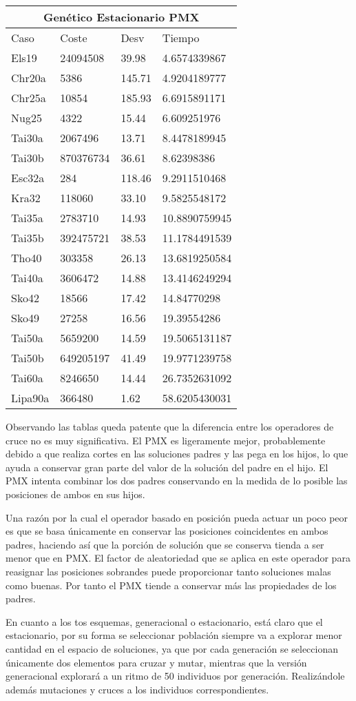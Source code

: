 \documentclass[twoside]{article}
\begin{document}
\begin{table}[h]
\centering
    \begin{tabular}{llll}
    \hline
    \multicolumn{4}{c}{Genético Estacionario PMX} \\
    \toprule
    Caso               & Coste & Desv & Tiempo \\
    \midrule
    Els19&24094508&39.98&4.6574339867\\
    Chr20a&5386&145.71&4.9204189777\\
    Chr25a&10854&185.93&6.6915891171\\
    Nug25&4322&15.44&6.609251976\\
    Tai30a&2067496&13.71&8.4478189945\\
    Tai30b&870376734&36.61&8.62398386\\
    Esc32a&284&118.46&9.2911510468\\
    Kra32&118060&33.10&9.5825548172\\
    Tai35a&2783710&14.93&10.8890759945\\
    Tai35b&392475721&38.53&11.1784491539\\
    Tho40&303358&26.13&13.6819250584\\
    Tai40a&3606472&14.88&13.4146249294\\
    Sko42&18566&17.42&14.84770298\\
    Sko49&27258&16.56&19.39554286\\
    Tai50a&5659200&14.59&19.5065131187\\
    Tai50b&649205197&41.49&19.9771239758\\
    Tai60a&8246650&14.44&26.7352631092\\
    Lipa90a&366480&1.62&58.6205430031\\
    \bottomrule
    \end{tabular}
    \caption{}
\end{table}


Observando las tablas queda patente que la diferencia entre los operadores
de cruce no es muy significativa. El PMX es ligeramente mejor, probablemente
debido a que realiza cortes en las soluciones padres y las pega en los hijos,
lo que ayuda a conservar gran parte del valor de la solución del padre en el hijo.
El PMX intenta combinar los dos padres conservando en la medida de lo posible las
posiciones de ambos en sus hijos.

Una razón por la cual el operador basado en posición pueda actuar un poco peor
es que se basa únicamente en conservar las posiciones coincidentes en ambos padres, haciendo
así que la porción de solución que se conserva tienda a ser menor que en PMX.
El factor de aleatoriedad que se aplica en este operador para reasignar las
posiciones sobrandes puede proporcionar tanto soluciones malas como buenas. Por tanto
el PMX tiende a conservar más las propiedades de los padres.


En cuanto a los tos esquemas, generacional o estacionario, está claro que
el estacionario, por su forma se seleccionar población siempre va a explorar
menor cantidad en el espacio de soluciones, ya que por cada generación se
seleccionan únicamente dos elementos para cruzar y mutar, mientras que la
versión generacional explorará a un ritmo de 50 individuos por generación. Realizándole
además mutaciones y cruces a los individuos correspondientes.
\end{document}
